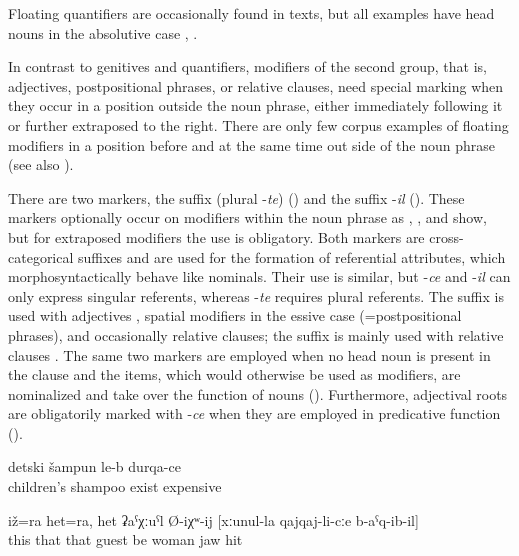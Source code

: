 Floating quantifiers are occasionally found in texts, but all examples have head nouns in the absolutive case , . 

In contrast to genitives and quantifiers, modifiers of the second group, that is, adjectives, postpositional phrases, or relative clauses, need special marking when they occur in a position outside the noun phrase, either immediately following it or further extraposed to the right. There are only few corpus examples of floating modifiers in a position before and at the same time out side of the noun phrase  (see also ).

There are two markers, the suffix  (plural -\textit{te}) () and the suffix -\textit{il} (). These markers optionally occur on modifiers within the noun phrase as , ,  and  show, but for extraposed modifiers the use is obligatory. Both markers are cross-categorical suffixes and are used for the formation of referential attributes, which morphosyntactically behave like nominals. Their use is similar, but -\textit{ce} and -\textit{il} can only express singular referents, whereas -\textit{te} requires plural referents. The suffix  is used with adjectives , spatial modifiers in the essive case (=postpositional phrases), and occasionally relative clauses; the suffix  is mainly used with relative clauses . The same two markers are employed when no head noun is present in the clause and the items, which would otherwise be used as modifiers, are nominalized and take over the function of nouns (). Furthermore, adjectival roots are obligatorily marked with -\textit{ce} when they are employed in predicative function ().

%
\begin{exe}
		\ex	\label{ex:There is shampoo for children, expensive@19b}
		\gll	detski	šampun	le-b	durqa-ce\\
			children's	shampoo	exist	expensive\\
		\glt	{}

	\ex	\label{ex:‎This also and this also is probably the man who hit the woman on the jaw2}
	\gll	iž=ra	het=ra,	het	ʡaˁχːuˁl	Ø-iχʷ-ij	[xːunul-la	qajqaj-li-cːe	b-aˁq-ib-il]\\
		this	that	that	guest	be	woman	jaw	hit\\
	\glt	{}
\end{exe}

